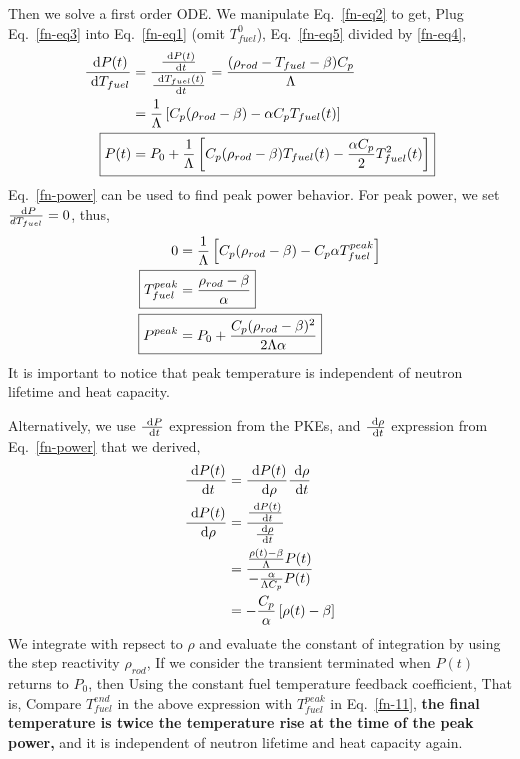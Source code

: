 \documentclass{school-22.211-notes}
\begin{document}
Then we solve a first order ODE. We manipulate Eq.~\ref{fn-eq2} to get,
Plug Eq.~\ref{fn-eq3} into Eq.~\ref{fn-eq1} (omit $T_{fuel}^0$), 
Eq.~\ref{fn-eq5} divided by \ref{fn-eq4}, 
\begin{align}
\frac{\dP(t)}{\dT_{fuel}} &= \frac{\frac{\dP(t)}{\dt}}{\frac{\dT_{fuel} (t)}{\dt}} =  \frac{(\rho_{rod} - T_{fuel} - \beta ) C_p}{\Lambda} \\
&= \frac{1}{\Lambda} \left[ C_p (\rho_{rod} - \beta) - \alpha C_p T_{fuel} (t) \right] \\
\Aboxed{ P(t) &= P_0 + \frac{1}{\Lambda} \left[ C_p (\rho_{rod} - \beta) T_{fuel} (t)  - \frac{\alpha C_p}{2} T^2_{fuel} (t) \right]  } \label{fn-power}
\end{align}
Eq.~\ref{fn-power} can be used to find peak power behavior. For peak power, we set $\frac{\mbox{ }\mathrm{d} P}{dT_{fuel}} = 0$, thus, 
\begin{align}
0 &= \frac{1}{\Lambda} \left[ C_p (\rho_{rod} - \beta) - C_p \alpha T_{fuel}^{peak} \right] \\
\Aboxed{ T_{fuel}^{peak} &= \frac{\rho_{rod} - \beta}{\alpha} } \label{fn-11} \\
\Aboxed{ P^{peak} &= P_0 + \frac{C_p (\rho_{rod} - \beta)^2}{2 \Lambda \alpha} }
\end{align}
It is important to notice that peak temperature is independent of neutron lifetime and heat capacity. 


Alternatively, we use $\frac{\mbox{ }\mathrm{d} P}{\mbox{ }\mathrm{d} t}$ expression from the PKEs, and $\frac{\mbox{ }\mathrm{d} \rho}{\mbox{ }\mathrm{d} t}$ expression from Eq.~\ref{fn-power} that we derived, 
\begin{align}
\frac{\mbox{ }\mathrm{d} P(t)}{\mbox{ }\mathrm{d} t} &= \frac{\mbox{ }\mathrm{d} P(t)}{\mbox{ }\mathrm{d} \rho} \frac{\mbox{ }\mathrm{d} \rho}{\mbox{ }\mathrm{d} t}  \\
\frac{\mbox{ }\mathrm{d} P(t)}{\mbox{ }\mathrm{d} \rho} &= \frac{  \frac{\mbox{ }\mathrm{d} P(t)}{\mbox{ }\mathrm{d} t} }{  \frac{\mbox{ }\mathrm{d} \rho}{\mbox{ }\mathrm{d} t} } \\
&= \frac{ \frac{\rho(t) - \beta}{\Lambda} P(t) }{ - \frac{\alpha}{\Lambda C_p } P(t)} \\
&= - \frac{C_p}{\alpha} \left[ \rho(t) - \beta \right] 
\end{align}
We integrate with repsect to $\rho$ and evaluate the constant of integration by using the step reactivity $\rho_{rod}$, 
If we consider the transient terminated when $P(t)$ returns to $P_0$, then 
Using the constant fuel temperature feedback coefficient, 
That is, 
  Compare $T_{fuel}^{end}$ in the above expression with $T_{fuel}^{peak}$ in Eq.~\ref{fn-11}, \textbf{the final temperature is twice the temperature rise at the time of the peak power,} and it is independent of neutron lifetime and heat capacity again. 
\end{document}
